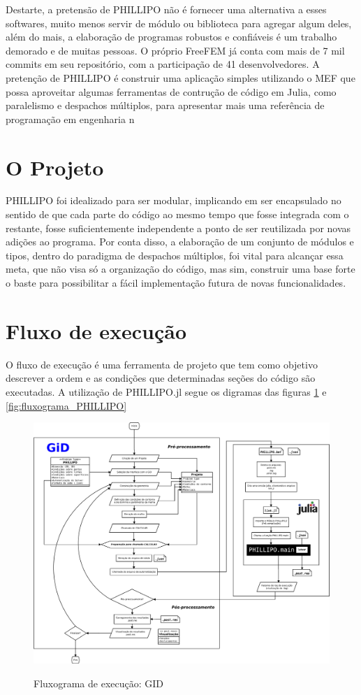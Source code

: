 Destarte, a pretensão de PHILLIPO não é fornecer uma alternativa a esses softwares, muito menos servir de módulo ou biblioteca para agregar algum deles, além do mais, a elaboração de programas robustos e confiáveis é um trabalho demorado e de muitas pessoas. O próprio FreeFEM já conta com mais de 7 mil commits em seu repositório, com a participação de 41 desenvolvedores. A pretenção de PHILLIPO é construir uma aplicação simples utilizando o MEF que possa aproveitar algumas ferramentas de contrução de código em Julia, como paralelismo e despachos múltiplos, para apresentar mais uma referência de programação em engenharia n
\section{O Projeto}

PHILLIPO foi idealizado para ser modular, implicando em ser encapsulado no sentido de que cada parte do código ao mesmo tempo que fosse integrada com o restante, fosse suficientemente independente a ponto de ser reutilizada por novas adições ao programa. Por conta disso, a elaboração de um conjunto de módulos e tipos, dentro do paradigma de despachos múltiplos, foi vital para alcançar essa meta, que não visa só a organização do código, mas sim, construir uma base forte o baste para possibilitar a fácil implementação futura de novas funcionalidades.

\section{Fluxo de execução}

O fluxo de execução é uma ferramenta de projeto que tem como objetivo descrever a ordem e as condições que determinadas seções do código são executadas. A utilização de PHILLIPO.jl segue os digramas das figuras \ref{fig:fluxograma_GID} e \ref{fig:fluxograma_PHILLIPO}

\begin{figure}
    \centering
    \caption{Fluxograma de execução: GID}
    \includegraphics[width = \textwidth]{Figuras/fluxograma_GID.pdf}
    \label{fig:fluxograma_GID}
\end{figure}

